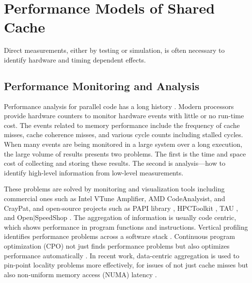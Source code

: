 \section{Performance Models of Shared Cache}


Direct measurements, either by testing or simulation, is often
necessary to identify hardware and timing dependent effects.

\subsection{Performance Monitoring and Analysis}

Performance analysis for parallel code has a long history \citep{Meira+:Carnival96,Reed+:ICPPW96,Darema+:Metrics87}.
Modern processors provide hardware counters to monitor hardware events
with little or no run-time cost.  The events related to memory
performance include the frequency of cache misses, cache coherence
misses, and various cycle counts including stalled cycles.  
When many events are being monitored in a large system over a long
execution, the large volume of results presents two problems.  The
first is the time and space cost of collecting and storing these
results.  The second is analysis---how to identify high-level
information from low-level measurements.  

These problems are solved by monitoring and visualization tools
including commercial ones such as Intel VTune Amplifier, AMD
CodeAnalysist, and CrayPat, and open-source projects such as PAPI
library \citep{Browne+:JHPCA00}, HPCToolkit \citep{Adhianto+:CCPE10},
TAU \citep{ShendeM:IJHPCA06}, and Open$|$SpeedShop
\citep{Schulz+:SP08}.  The aggregation of information is usually code
centric, which shows performance in program functions and
instructions.  Vertical profiling identifies performance problems
across a software stack \citep{Hauswirth+:SPE10}.  Continuous program
optimization (CPO) not just finds performance problems but also
optimizes performance
automatically \citep{Cascaval+:PACT05,Tam+:ASPLOS09,Childers+:IPDPS03,Cascaval+:JRD06}.  In recent work,
data-centric aggregation is used to pin-point locality problems more
effectively, for issues of not just cache misses but also non-uniform
memory access (NUMA) latency
\citep{McCurdyV:ISPASS10,LiuM:CGO11,LiuM:PPOPP14}.




